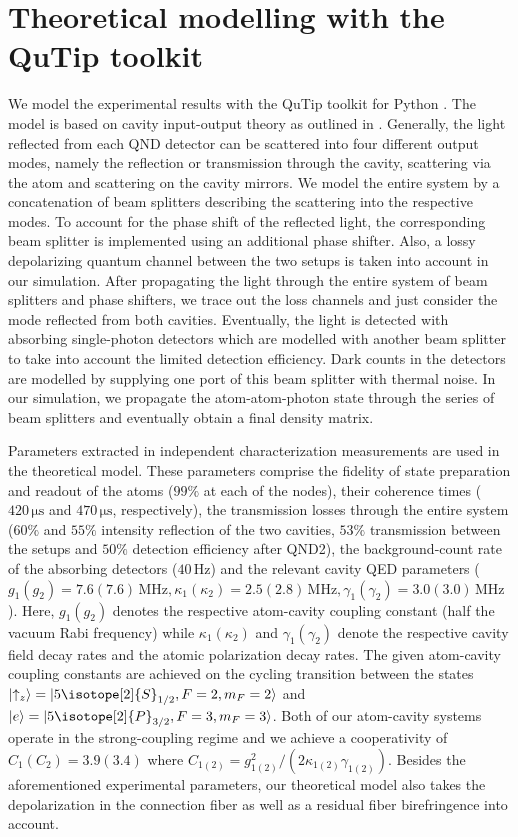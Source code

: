 \documentclass[prl,amsmath,amssymb,bibnotes,aps,longbibliography,12pt]{revtex4-1}
\newcommand{\ket}[1]{|{#1}\rangle}
\begin{document}
\section{Theoretical modelling with the QuTip toolkit}
\noindent We model the experimental results with the QuTip toolkit for Python \cite{johansson2012}. The model is based on cavity input-output theory as outlined in \cite{kuhn2015}. Generally, the light reflected from each QND detector can be scattered into four different output modes, namely the reflection or transmission through the cavity, scattering via the atom and scattering on the cavity mirrors. We model the entire system by a concatenation of beam splitters describing the scattering into the respective modes. To account for the phase shift of the reflected light, the corresponding beam splitter is implemented using an additional phase shifter. Also, a lossy depolarizing quantum channel between the two setups is taken into account in our simulation. After propagating the light through the entire system of beam splitters and phase shifters, we trace out the loss channels and just consider the mode reflected from both cavities. Eventually, the light is detected with absorbing single-photon detectors which are modelled with another beam splitter to take into account the limited detection efficiency. Dark counts in the detectors are modelled by supplying one port of this beam splitter with thermal noise. In our simulation, we propagate the atom-atom-photon state through the series of beam splitters and eventually obtain a final density matrix.

Parameters extracted in independent characterization measurements are used in the theoretical model. These parameters comprise the fidelity of state preparation and readout of the atoms ($99\%$ at each of the nodes), their coherence times ($420\,\mathrm{\mu s}$ and $470\,\mathrm{\mu s}$, respectively), the transmission losses through the entire system ($60\%$ and $55\%$ intensity reflection of the two cavities, $53\%$ transmission between the setups and $50\%$ detection efficiency after QND2), the background-count rate of the absorbing detectors ($40\,\mathrm{Hz}$) and the relevant cavity QED parameters ($g_1(g_2)=7.6(7.6)\,\mathrm{MHz},\kappa_1(\kappa_2)=2.5(2.8)\,\mathrm{MHz},\gamma_1(\gamma_2)=3.0(3.0)\,\mathrm{MHz}$). Here, $g_{1}(g_{2})$ denotes the respective atom-cavity coupling constant (half the vacuum Rabi frequency) while $\kappa_{1}(\kappa_{2})$ and $\gamma_{1}(\gamma_{2})$ denote the respective cavity field decay rates and the atomic polarization decay rates. The given atom-cavity coupling constants are achieved on the cycling transition between the states $\ket{\uparrow_z}=\ket{5\isotope[2]{S}_{1/2}, F=2, m_F=2}$ and 
$\ket{e}=\ket{5\isotope[2]{P}_{3/2}, F=3, m_F=3}$. Both of our atom-cavity systems operate in the strong-coupling regime and we achieve a cooperativity of $C_1(C_2)=3.9(3.4)$ where $C_{1(2)}=g_{1(2)}^2/(2\kappa_{1(2)}\gamma_{1(2)})$. Besides the aforementioned experimental parameters, our theoretical model also takes the depolarization in the connection fiber as well as a residual fiber birefringence into account. 
\end{document}
